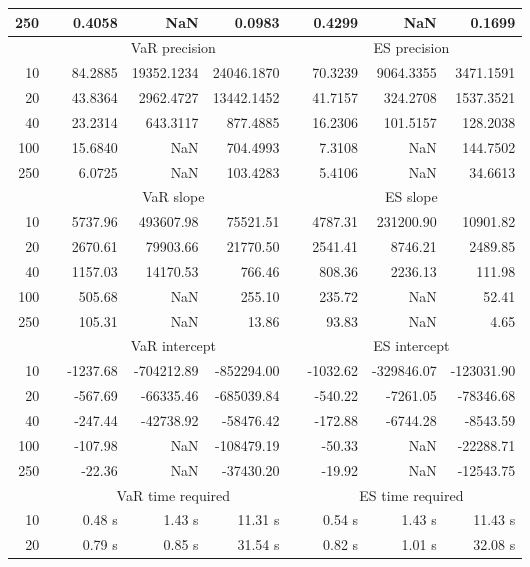 {{\begin{longtable}{rr rrr r rrr}
250 && 0.4058  &    NaN  & 0.0983 && 0.4299  &    NaN  & 0.1699  \\ 
\hline 
 & & \multicolumn{3}{c}{VaR precision} &&  \multicolumn{3}{c}{ES precision} \\ \cline{3-5}  \cline{7-9}
10 &&  84.2885 & 19352.1234 & 24046.1870 & & 70.3239 & 9064.3355 & 3471.1591 \\ 
20 &&  43.8364 & 2962.4727 & 13442.1452 & & 41.7157 & 324.2708 & 1537.3521 \\ 
40 &&  23.2314 & 643.3117 & 877.4885 & & 16.2306 & 101.5157 & 128.2038 \\ 
100 &&  15.6840 &    NaN & 704.4993 & & 7.3108 &    NaN & 144.7502 \\ 
250 &&  6.0725 &    NaN & 103.4283 & & 5.4106 &    NaN & 34.6613 \\ 
\hline 
 & & \multicolumn{3}{c}{ VaR slope} && \multicolumn{3}{c}{ES slope} \\ \cline{3-5}  \cline{7-9}
10 && 5737.96 & 493607.98 & 75521.51 && 4787.31 & 231200.90 & 10901.82 \\ 
20 && 2670.61 & 79903.66 & 21770.50 && 2541.41 & 8746.21 & 2489.85 \\ 
40 && 1157.03 & 14170.53 & 766.46 && 808.36 & 2236.13 & 111.98 \\ 
100 && 505.68 &  NaN & 255.10 && 235.72 &  NaN & 52.41 \\ 
250 && 105.31 &  NaN & 13.86 && 93.83 &  NaN & 4.65 \\ 
\hline 
 & & \multicolumn{3}{c}{ VaR intercept} &&  \multicolumn{3}{c}{ES intercept} \\ \cline{3-5}  \cline{7-9}
10 &&  -1237.68 & -704212.89 & -852294.00 && -1032.62 & -329846.07 & -123031.90 \\ 
20 &&  -567.69 & -66335.46 & -685039.84 && -540.22 & -7261.05 & -78346.68 \\ 
40 &&  -247.44 & -42738.92 & -58476.42 && -172.88 & -6744.28 & -8543.59 \\ 
100 &&  -107.98 &  NaN & -108479.19 && -50.33 &  NaN & -22288.71 \\ 
250 &&  -22.36 &  NaN & -37430.20 && -19.92 &  NaN & -12543.75 \\ 
\hline 
 & & \multicolumn{3}{c}{VaR time required} && \multicolumn{3}{c}{ES time required} \\ \cline{3-5}  \cline{7-9}
10 & & 0.48 s & 1.43 s & 11.31 s && 0.54 s & 1.43 s & 11.43 s \\ 
20 & & 0.79 s & 0.85 s & 31.54 s && 0.82 s & 1.01 s & 32.08 s \\ 

\end{longtable}}}
